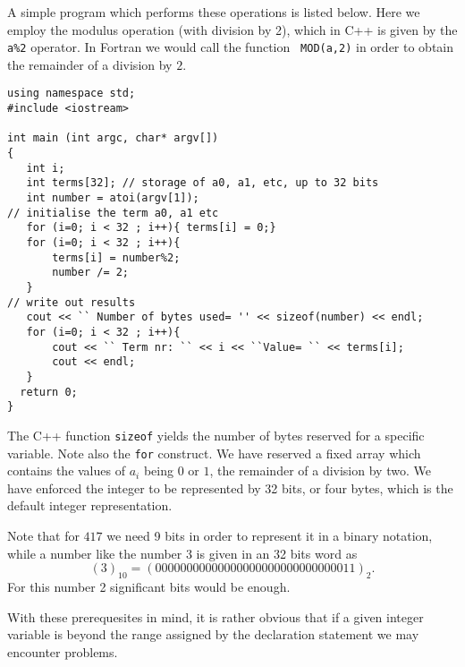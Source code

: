 A simple program which performs these operations is listed below. Here we 
employ the modulus operation (with division by 2), which in C++ is given by the \verb?a%2? operator.
In Fortran  we would call the function
\verb? MOD(a,2)? in order to obtain the remainder of a division by $2$. 
\lstset{language=c++}
\begin{lstlisting}[title={\href{{https://github.com/CompPhysics/CompPhysBook1/tree/master/doc/Programs/Chapter2/cpp/program5.cpp}}{Click here to view code}}]
using namespace std;
#include <iostream>

int main (int argc, char* argv[])
{
   int i; 
   int terms[32]; // storage of a0, a1, etc, up to 32 bits
   int number = atoi(argv[1]); 
// initialise the term a0, a1 etc
   for (i=0; i < 32 ; i++){ terms[i] = 0;}
   for (i=0; i < 32 ; i++){ 
       terms[i] = number%2;
       number /= 2;
   }
// write out results
   cout << `` Number of bytes used= '' << sizeof(number) << endl;
   for (i=0; i < 32 ; i++){ 
       cout << `` Term nr: `` << i << ``Value= `` << terms[i];
       cout << endl;
   }
  return 0;  
}
\end{lstlisting}
The C++ function \verb?sizeof? yields the number of bytes reserved for 
a specific variable. Note also the \verb?for? construct. We have reserved a 
fixed array which contains the values of $a_i$ being $0$ or $1$, the remainder
of a division by two. We have enforced the integer to be represented by 32 bits, or four
bytes, which is the default integer representation.

Note that for $417$ we need 9 bits in order to represent it in a binary notation, while a number like
the number 3 is given in an 32 bits word as
\[
  (3)_{10}= (00000000000000000000000000000011)_2.
\]
For this number  2 significant bits would be enough.



With these prerequesites in mind, it is rather obvious that
if a given integer variable is beyond the range assigned by the 
declaration statement we may encounter problems.



